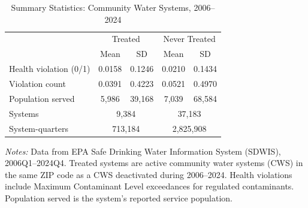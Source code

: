 \begin{table}[t]
\centering
\caption{Summary Statistics: Community Water Systems, 2006--2024}
\label{tab:summary}
\begin{threeparttable}
\begin{tabular}{lcccc}
\hline\hline
 & \multicolumn{2}{c}{Treated} & \multicolumn{2}{c}{Never Treated} \\
 & Mean & SD & Mean & SD \\
\hline
Health violation (0/1) & 0.0158 & 0.1246 & 0.0210 & 0.1434 \\
Violation count & 0.0391 & 0.4223 & 0.0521 & 0.4970 \\
Population served & 5,986 & 39,168 & 7,039 & 68,584 \\
\hline
Systems & \multicolumn{2}{c}{9,384} & \multicolumn{2}{c}{37,183} \\
System-quarters & \multicolumn{2}{c}{713,184} & \multicolumn{2}{c}{2,825,908} \\
\hline\hline
\end{tabular}
\begin{tablenotes}[flushleft]\small
\item \textit{Notes:} Data from EPA Safe Drinking Water Information System (SDWIS), 2006Q1--2024Q4. Treated systems are active community water systems (CWS) in the same ZIP code as a CWS deactivated during 2006--2024. Health violations include Maximum Contaminant Level exceedances for regulated contaminants. Population served is the system's reported service population.
\end{tablenotes}
\end{threeparttable}
\end{table}


